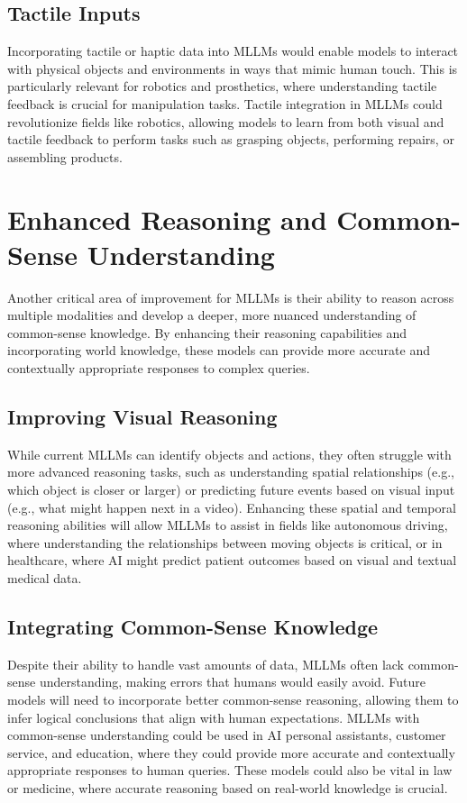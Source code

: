 \subsection{Tactile Inputs}

Incorporating tactile or haptic data into MLLMs would enable models to interact with physical objects and environments in ways that mimic human touch. This is particularly relevant for robotics and prosthetics, where understanding tactile feedback is crucial for manipulation tasks. Tactile integration in MLLMs could revolutionize fields like robotics, allowing models to learn from both visual and tactile feedback to perform tasks such as grasping objects, performing repairs, or assembling products.

\section{Enhanced Reasoning and Common-Sense Understanding}

Another critical area of improvement for MLLMs is their ability to reason across multiple modalities and develop a deeper, more nuanced understanding of common-sense knowledge. By enhancing their reasoning capabilities and incorporating world knowledge, these models can provide more accurate and contextually appropriate responses to complex queries.

\subsection{Improving Visual Reasoning}

While current MLLMs can identify objects and actions, they often struggle with more advanced reasoning tasks, such as understanding spatial relationships (e.g., which object is closer or larger) or predicting future events based on visual input (e.g., what might happen next in a video). Enhancing these spatial and temporal reasoning abilities will allow MLLMs to assist in fields like autonomous driving, where understanding the relationships between moving objects is critical, or in healthcare, where AI might predict patient outcomes based on visual and textual medical data.

\subsection{Integrating Common-Sense Knowledge}

Despite their ability to handle vast amounts of data, MLLMs often lack common-sense understanding, making errors that humans would easily avoid. Future models will need to incorporate better common-sense reasoning, allowing them to infer logical conclusions that align with human expectations. MLLMs with common-sense understanding could be used in AI personal assistants, customer service, and education, where they could provide more accurate and contextually appropriate responses to human queries. These models could also be vital in law or medicine, where accurate reasoning based on real-world knowledge is crucial.

